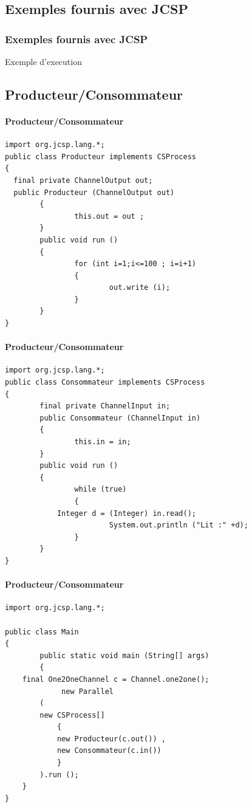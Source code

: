 \documentclass[slidetop,11pt]{beamer}
\begin{document}
\subsection{Exemples fournis avec JCSP}
\begin{frame}
\frametitle{Exemples fournis avec JCSP}
Exemple d'execution
\end{frame}

\subsection{Producteur/Consommateur}
\begin{frame}[containsverbatim]
\framesubtitle{Producteur/Consommateur}
\begin{lstlisting}[frame=trBL,title={Producteurs-Consommateurs: Producteur.java}]
import org.jcsp.lang.*;
public class Producteur implements CSProcess
{
  final private ChannelOutput out;
  public Producteur (ChannelOutput out)
        {
                this.out = out ;
        }
        public void run ()
        {
                for (int i=1;i<=100 ; i=i+1)
                {
                        out.write (i);
                }
        }
}
\end{lstlisting}
\end{frame}

\begin{frame}[containsverbatim]
\framesubtitle{Producteur/Consommateur}
\begin{lstlisting}[frame=trBL,title={Producteurs-Consommateurs: Consommateur.java}]
import org.jcsp.lang.*;
public class Consommateur implements CSProcess
{
        final private ChannelInput in;
        public Consommateur (ChannelInput in)
        {
                this.in = in;
        }
        public void run ()
        {
                while (true)
                {
			Integer d = (Integer) in.read();
                        System.out.println ("Lit :" +d);
                }
        }
}
\end{lstlisting}
\end{frame}

\begin{frame}[containsverbatim]
\framesubtitle{Producteur/Consommateur}
\begin{lstlisting}[frame=trBL,title={Producteurs-Consommateurs: Main.java}]
import org.jcsp.lang.*;

public class Main
{
        public static void main (String[] args)
        {
	final One2OneChannel c = Channel.one2one();
             new Parallel
		(
		new CSProcess[]
			{
			new Producteur(c.out()) ,
			new Consommateur(c.in())
			} 
		).run ();
	}
}
\end{lstlisting}
\end{frame}
\end{document}
